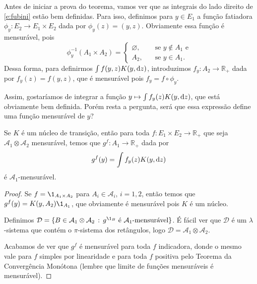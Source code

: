 
Antes de iniciar a prova do teorema, vamos ver que as integrais do lado direito de \eqref{e:fubini} estão bem definidas.
Para isso, definimos para $y \in E_1$ a função fatiadora $\phi_y: E_2 \to E_1 \times E_2$ dada por $\phi_y(z) = (y, z)$.
Obviamente essa função é mensurável, pois
\begin{equation}
  \phi_y^{-1}(A_1 \times A_2) =
  \begin{cases}
    \varnothing, \quad & \text{ se $y \not \in A_1$ e}\\
    A_2, & \text{ se $y \in A_1$}.
  \end{cases}
\end{equation}
Dessa forma, para definirmos $\int f(y,z) K(y, \mathop{}\!\mathrm{d} z)$, introduzimos $f_y: A_2 \to \mathbb{R}_+$ dada por $f_y(z) = f(y,z)$, que é mensurável pois $f_y = f \circ \phi_y$.

Assim, gostaríamos de integrar a função $y \mapsto \int f_y(z) K(y, \mathop{}\!\mathrm{d} z)$, que está obviamente bem definida.
Porém resta a pergunta, será que essa expressão define uma função mensurável de $y$?

\begin{lemma}
  Se $K$ é um núcleo de transição, então para toda $f: E_1 \times E_2 \to \mathbb{R}_+$ que seja $\mathcal{A}_1 \otimes \mathcal{A}_2$ mensurável, temos que $g^f:A_1 \to \mathbb{R}_+$ dada por
  \begin{equation}
    g^f(y) = \int f_y(z) K(y, \mathop{}\!\mathrm{d} z)
  \end{equation}
  é $\mathcal{A}_1$-mensurável.
\end{lemma}

\begin{proof}
  Se $f = \1_{A_1 \times A_2}$ para $A_i \in \mathcal{A}_i$, $i = 1,2$, então temos que $g^f(y) = K(y, A_2) \1_{A_1}$, que obviamente é mensurável pois $K$ é um núcleo.

  Definimos $\mathcal{D} = \{B \in \mathcal{A}_1 \otimes \mathcal{A}_2\, : \, g^{\1_B} \text{ é $\mathcal{A}_1$-mensurável}\}$.
  É fácil ver que $\mathcal{D}$ é um $\lambda$-sistema que contém o $\pi$-sistema dos retângulos, logo $\mathcal{D} = \mathcal{A}_1 \otimes \mathcal{A}_2$.

  Acabamos de ver que $g^f$ é mensurável para toda $f$ indicadora, donde o mesmo vale para $f$ simples por linearidade e para toda $f$ positiva pelo Teorema da Convergência Monótona (lembre que limite de funções mensuráveis é mensurável).
\end{proof}


